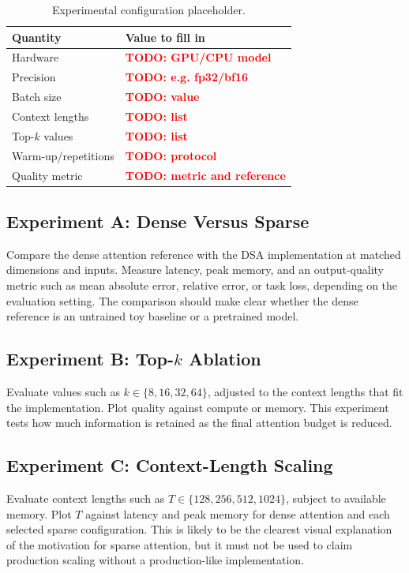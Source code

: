 \documentclass[11pt]{article}
\newcommand{\TODO}[1]{\textcolor{red}{\textbf{TODO: #1}}}
\begin{document}
\begin{table}[H]
\centering
\caption{Experimental configuration placeholder.}
\label{tab:setup}
\begin{tabular}{ll}
\toprule
Quantity & Value to fill in \\
\midrule
Hardware & \TODO{GPU/CPU model} \\
Precision & \TODO{e.g. fp32/bf16} \\
Batch size & \TODO{value} \\
Context lengths & \TODO{list} \\
Top-$k$ values & \TODO{list} \\
Warm-up/repetitions & \TODO{protocol} \\
Quality metric & \TODO{metric and reference} \\
\bottomrule
\end{tabular}
\end{table}

\subsection{Experiment A: Dense Versus Sparse}

Compare the dense attention reference with the DSA implementation at matched
dimensions and inputs. Measure latency, peak memory, and an output-quality
metric such as mean absolute error, relative error, or task loss, depending on
the evaluation setting. The comparison should make clear whether the dense
reference is an untrained toy baseline or a pretrained model.

\subsection{Experiment B: Top-$k$ Ablation}

Evaluate values such as $k\in\{8,16,32,64\}$, adjusted to the context lengths
that fit the implementation. Plot quality against compute or memory. This
experiment tests how much information is retained as the final attention
budget is reduced.

\subsection{Experiment C: Context-Length Scaling}

Evaluate context lengths such as $T\in\{128,256,512,1024\}$, subject to
available memory. Plot $T$ against latency and peak memory for dense attention
and each selected sparse configuration. This is likely to be the clearest
visual explanation of the motivation for sparse attention, but it must not be
used to claim production scaling without a production-like implementation.
\end{document}
